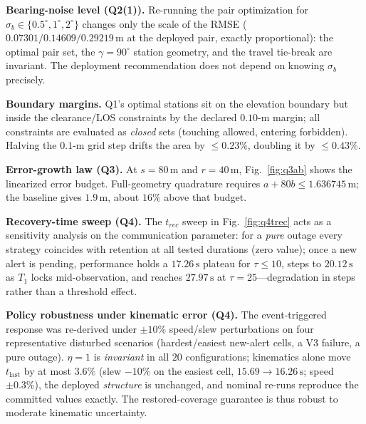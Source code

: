 \textbf{Bearing-noise level (Q2(1)).} Re-running the pair optimization for
$\sigma_b\in\{0.5^\circ,1^\circ,2^\circ\}$ changes only the scale of the RMSE
($0.07301/0.14609/0.29219\,\mathrm{m}$ at the deployed pair, exactly proportional): the optimal pair set,
the $\gamma=90^\circ$ station geometry, and the travel tie-break are invariant. The
deployment recommendation does not depend on knowing $\sigma_b$ precisely.

\textbf{Boundary margins.} Q1's optimal stations sit on the elevation boundary but
inside the clearance/LOS constraints by the declared $0.10$-m margin; all constraints
are evaluated as \emph{closed} sets (touching allowed, entering forbidden). Halving the
$0.1$-m grid step drifts the area by $\le0.23\%$, doubling it by $\le0.43\%$.

\textbf{Error-growth law (Q3).} At $s=80\,\mathrm{m}$ and $r=40\,\mathrm{m}$,
Fig.~\ref{fig:q3ab} shows the linearized error budget. Full-geometry quadrature
requires $a+80b\le1.636745\,\mathrm{m}$; the baseline gives $1.9\,\mathrm{m}$,
about $16\%$ above that budget.

\textbf{Recovery-time sweep (Q4).} The $t_{rec}$ sweep in Fig.~\ref{fig:q4trec} acts as
a sensitivity analysis on the communication parameter: for a \emph{pure} outage every
strategy coincides with retention at all tested durations (zero value); once a new
alert is pending, performance holds a $17.26\,\mathrm{s}$ plateau for $\tau\le10$, steps
to $20.12\,\mathrm{s}$ as $T_1$ locks mid-observation, and reaches $27.97\,\mathrm{s}$ at
$\tau=25$---degradation in steps rather than a threshold effect.

\textbf{Policy robustness under kinematic error (Q4).} The event-triggered response
was re-derived under $\pm10\%$ speed/slew perturbations on four representative
disturbed scenarios (hardest/easiest new-alert cells, a V3 failure, a pure outage).
$\eta=1$ is \emph{invariant} in all $20$ configurations; kinematics alone move
$t_{\mathrm{last}}$ by at most $3.6\%$ (slew $-10\%$ on the easiest cell,
$15.69\to16.26\,\mathrm{s}$; speed $\pm0.3\%$), the deployed \emph{structure} is
unchanged, and nominal re-runs reproduce the committed values exactly. The
restored-coverage guarantee is thus robust to moderate kinematic uncertainty.
